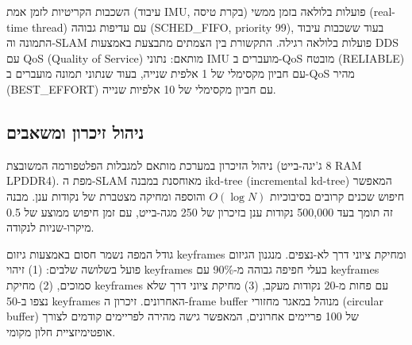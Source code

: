 השכבות הקריטיות לזמן אמת (עיבוד IMU, בקרת טיסה) פועלות בלולאה בזמן ממשי (real-time thread) עם עדיפות גבוהה (SCHED_FIFO, priority 99), בעוד ששכבות עיבוד התמונה וה-SLAM פועלות בלולאה רגילה. התקשורת בין הצמתים מתבצעת באמצעות DDS עם QoS (Quality of Service) מותאם: נתוני IMU מועברים ב-QoS מובטח (RELIABLE) עם חביון מקסימלי של 1 אלפית שנייה, בעוד שנתוני תמונה מועברים ב-QoS מהיר (BEST_EFFORT) עם חביון מקסימלי של 10 אלפיות שנייה.

\subsection{ניהול זיכרון ומשאבים}
\label{sec:ch07_memory_management}

ניהול הזיכרון במערכת מותאם למגבלות הפלטפורמה המשובצת (8 ג'יגה-בייט RAM LPDDR4). מפת ה-SLAM מאוחסנת במבנה ikd-tree (incremental kd-tree) המאפשר חיפוש שכנים קרובים בסיבוכיות $O(\log N)$ והוספה ומחיקה מצטברת של נקודות ענן. מבנה זה תומך בעד 500,000 נקודות ענן בזיכרון של 250 מגה-בייט, עם זמן חיפוש ממוצע של 0.5 מיקרו-שניות לנקודה.

גודל המפה נשמר חסום באמצעות גיזום keyframes ומחיקת ציוני דרך לא-נצפים. מנגנון הגיזום פועל בשלושה שלבים: (1) זיהוי keyframes בעלי חפיפה גבוהה מ-90\% עם keyframes סמוכים, (2) מחיקת keyframes עם פחות מ-20 נקודות מעקב, (3) מחיקת ציוני דרך שלא נצפו ב-50 keyframes האחרונים. זיכרון ה-frame buffer מנוהל במאגר מחזורי (circular buffer) של 100 פריימים אחרונים, המאפשר גישה מהירה לפריימים קודמים לצורך אופטימיזציית חלון מקומי.

\begin{table}[htbp]
\centering
\caption{התפלגות צריכת משאבים במערכת NavigatorCrew על Jetson Orin NX.}
\label{tab:ch07_resource_usage}
\end{table}

